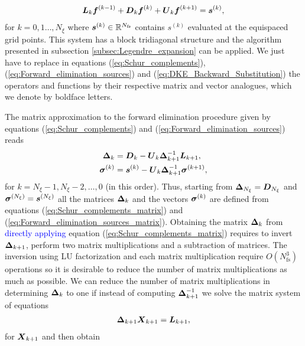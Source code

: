 \begin{align}
	\vb*{L}_k  \vb*{f}^{(k-1)} + \vb*{D}_k  \vb*{f}^{(k)} + \vb*{U}_k   \vb*{f}^{(k+1)} = \vb*{s}^{(k)},   \label{eq:DKE_Legendre_expansion_Fourier_collocation}
\end{align}
for $k=0,1\ldots, N_\xi$ where $\vb*{s}^{(k)}\in\mathbb{R}^{N_{\text{fs}}}$
contains $s^{(k)}$ evaluated at the equispaced grid points. This system has a block tridiagonal structure and the algorithm presented in subsection \ref{subsec:Legendre_expansion} can be applied. We just have to replace in equations (\ref{eq:Schur_complements}), (\ref{eq:Forward_elimination_sources}) and (\ref{eq:DKE_Backward_Substitution}) the operators and functions by their respective matrix and vector analogues, which we denote by boldface letters. 

The matrix approximation to the forward elimination procedure given by equations (\ref{eq:Schur_complements}) and (\ref{eq:Forward_elimination_sources}) reads
\begin{align}
	\vb*{\Delta}_k & = \vb*{D}_k - \vb*{U}_{k} \vb*{\Delta}_{k+1}^{-1} \vb*{L}_{k+1}, 
	\label{eq:Schur_complements_matrix}
	\\
	\vb*{\sigma}^{(k)} & = \vb*{s}^{(k)} - \vb*{U}_{k}  \vb*{\Delta}_{k+1}^{-1}    \vb*{\sigma}^{(k+1)},
	\label{eq:Forward_elimination_sources_matrix}
\end{align}
for $k=N_\xi-1, N_\xi-2, \ldots, 0$ (in this order). Thus, starting from $\vb*{\Delta}_{N_\xi}=\vb*{D}_{N_\xi}$ and $\vb*{\sigma}^{(N_\xi)}=\vb*{s}^{(N_\xi)}$ all the matrices $\vb*{\Delta}_k$ and the vectors $\vb*{\sigma}^{(k)}$ are defined from equations (\ref{eq:Schur_complements_matrix}) and (\ref{eq:Forward_elimination_sources_matrix}). Obtaining the matrix $\vb*{\Delta}_k$ from \textcolor{blue}{directly applying} equation (\ref{eq:Schur_complements_matrix}) requires to invert $\vb*{\Delta}_{k+1}$, perform two matrix multiplications and a subtraction of matrices. The inversion using LU factorization and each matrix multiplication require $O(N_{\text{fs}}^3)$ operations so it is desirable to reduce the number of matrix multiplications as much as possible. We can reduce the number of matrix multiplications in determining $\vb*{\Delta}_{k}$ to one if instead of computing $\vb*{\Delta}_{k+1}^{-1}$ we solve the matrix system of equations
%
\begin{align}
	\vb*{\Delta}_{k+1} \vb*{X}_{k+1} = \vb*{L}_{k+1},
	\label{eq:Forward_elimination_X}  
\end{align}
for $\vb*{X}_{k+1}$ and then obtain 
